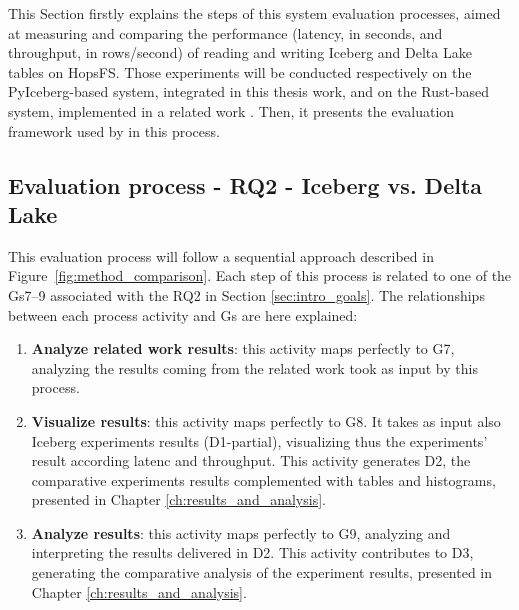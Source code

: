 This Section firstly explains the steps of this system evaluation processes, aimed at measuring and comparing the performance (latency, in seconds, and throughput, in rows/second) of reading and writing Iceberg and Delta Lake tables on \gls{HopsFS}. Those experiments will be conducted respectively on the PyIceberg-based system, integrated in this thesis work, and on the Rust-based system, implemented in a related work \cite{manfrediReducingReadWrite2024}. Then, it presents the evaluation framework used by in this process.



\subsection{Evaluation process - RQ2 - Iceberg vs. Delta Lake}
\label{subsec:eval_process_iceberg_delta}
This evaluation process will follow a sequential approach described in Figure~\ref{fig:method_comparison}. Each step of this process is related to one of the \glspl{G}7--9 associated with the \gls{RQ}2 in Section \ref{sec:intro_goals}. The relationships between each process activity and \glspl{G} are here explained:
\begin{enumerate}
    \item \textbf{Analyze related work results}: this activity maps perfectly to \gls{G}7, analyzing the results coming from the related work took as input by this process.
    \item \textbf{Visualize results}: this activity maps perfectly to \gls{G}8. It takes as input also Iceberg experiments results (\gls{D}1-partial), visualizing thus the experiments' result according latenc and throughput. This activity generates \gls{D}2, the comparative experiments results complemented with tables and histograms, presented in Chapter \ref{ch:results_and_analysis}.
    \item \textbf{Analyze results}: this activity maps perfectly to \gls{G}9, analyzing and interpreting the results delivered in \gls{D}2. This activity contributes to \gls{D}3, generating the comparative analysis of the experiment results, presented in Chapter \ref{ch:results_and_analysis}.
\end{enumerate}
